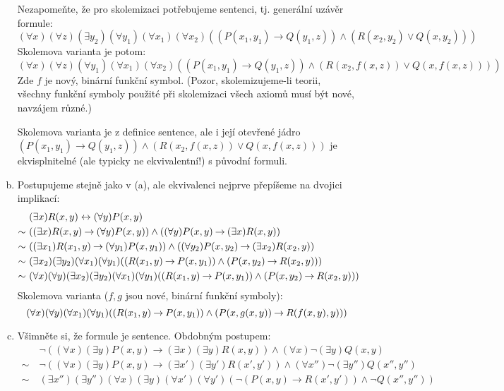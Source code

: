 \begin{problem}
\begin{solution}
\begin{enumerate}[(a)]
            Nezapomeňte, že pro skolemizaci potřebujeme sentenci, tj. generální uzávěr formule:
            $$
            (\forall x)(\forall z)(\exists y_2)(\forall y_1)(\forall x_1)(\forall x_2)((P(x_1,y_1)\to Q(y_1,z))\wedge (R(x_2,y_2)\vee Q(x,y_2)))
            $$
            Skolemova varianta je potom:
            $$
            (\forall x)(\forall z)(\forall y_1)(\forall x_1)(\forall x_2)((P(x_1,y_1)\to Q(y_1,z))\wedge (R(x_2,f(x,z))\vee Q(x,f(x,z))))
            $$
            Zde $f$ je nový, binární funkční symbol. (Pozor, skolemizujeme-li teorii, všechny funkční symboly použité při skolemizaci všech axiomů musí být nové, navzájem různé.)

            Skolemova varianta je z definice sentence, ale i její otevřené jádro $(P(x_1,y_1)\to Q(y_1,z))\wedge (R(x_2,f(x,z))\vee Q(x,f(x,z)))$ je ekvisplnitelné (ale typicky ne ekvivalentní!) s původní formuli.
            
            \item Postupujeme stejně jako v (a), ale ekvivalenci nejprve přepíšeme na dvojici implikací:
            \begin{align*}
                &(\exists x)R(x,y)\leftrightarrow (\forall y)P(x,y)\\
                \sim\ &((\exists x)R(x,y)\mathbin{\rightarrow} (\forall y)P(x,y))\land((\forall y)P(x,y)\mathbin{\rightarrow} (\exists x)R(x,y))\\
                \sim\ &((\exists x_1)R(x_1,y)\mathbin{\rightarrow} (\forall y_1)P(x,y_1))\land((\forall y_2)P(x,y_2)\mathbin{\rightarrow} (\exists x_2)R(x_2,y))\\
                \sim\ &(\exists x_2)(\exists y_2)(\forall x_1)(\forall y_1)((R(x_1,y)\mathbin{\rightarrow} P(x,y_1))\land(P(x,y_2)\mathbin{\rightarrow} R(x_2,y)))\\
                \sim\ &(\forall x)(\forall y)(\exists x_2)(\exists y_2)(\forall x_1)(\forall y_1)((R(x_1,y)\mathbin{\rightarrow} P(x,y_1))\land(P(x,y_2)\mathbin{\rightarrow} R(x_2,y)))
            \end{align*}
            Skolemova varianta ($f,g$ jsou nové, binární funkční symboly):
            $$
            (\forall x)(\forall y)(\forall x_1)(\forall y_1)((R(x_1,y)\mathbin{\rightarrow} P(x,y_1))\land(P(x,g(x,y))\mathbin{\rightarrow} R(f(x,y),y)))
            $$

            \item Všimněte si, že formule je sentence. Obdobným postupem:
            \begin{align*}
            &\neg((\forall x)(\exists y)P(x,y)\to (\exists x)(\exists y)R(x,y))\wedge(\forall x)\neg(\exists y)Q(x,y)\\
            \sim\ &\neg((\forall x)(\exists y)P(x,y)\to (\exists x')(\exists y')R(x',y'))\wedge(\forall x'')\neg(\exists y'')Q(x'',y'')\\
            \sim\ & (\exists x'')(\exists y'')(\forall x)(\exists y)(\forall x')(\forall y')
            (    
                \neg(P(x,y)\to R(x',y'))\wedge\neg Q(x'',y'') 
            )
            \end{align*}
            

\end{enumerate}
\end{solution}
\end{problem}
